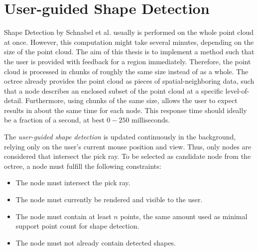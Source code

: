 \section{User-guided Shape Detection}
\label{sec:user_guided_sd}

Shape Detection by Schnabel et al. \cite{schnabel-2007-efficient} usually is performed on the whole point cloud at once. However, this computation might take several minutes, depending on the size of the point cloud. The aim of this thesis is to implement a method such that the user is provided with feedback for a region immediately. Therefore, the point cloud is processed in chunks of roughly the same size instead of as a whole. The octree already provides the point cloud as pieces of spatial-neighboring data, such that a node describes an enclosed subset of the point cloud at a specific level-of-detail. Furthermore, using chunks of the same size, allows the user to expect results in about the same time for each node. This response time should ideally be a fraction of a second, at best $0-250$ milliseconds. 

The \textit{user-guided shape detection} is updated continuously in the background, relying only on the user's current mouse position and view. Thus, only nodes are considered that intersect the pick ray. To be selected as candidate node from the octree, a node must fulfill the following constraints: 
\begin{itemize}
    \item The node must intersect the pick ray.
    \item The node must currently be rendered and visible to the user. 
    \item The node must contain at least $n$ points, the same amount used as minimal support point count for shape detection.
    \item The node must not already contain detected shapes.
\end{itemize}

